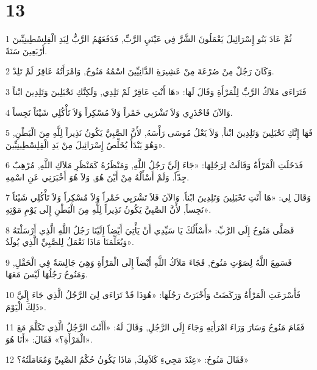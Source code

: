 \chapter{13}

\par 1 ثُمَّ عَادَ بَنُو إِسْرَائِيلَ يَعْمَلُونَ الشَّرَّ فِي عَيْنَيِ الرَّبِّ, فَدَفَعَهُمُ الرَّبُّ لِيَدِ الْفِلِسْطِينِيِّينَ أَرْبَعِينَ سَنَةً.
\par 2 وَكَانَ رَجُلٌ مِنْ صُرْعَةَ مِنْ عَشِيرَةِ الدَّانِيِّينَ اسْمُهُ مَنُوحُ, وَامْرَأَتُهُ عَاقِرٌ لَمْ تَلِدْ.
\par 3 فَتَرَاءَى مَلاَكُ الرَّبِّ لِلْمَرْأَةِ وَقَالَ لَهَا: «هَا أَنْتِ عَاقِرٌ لَمْ تَلِدِي, وَلَكِنَّكِ تَحْبَلِينَ وَتَلِدِينَ ابْناً
\par 4 وَالآنَ فَاحْذَرِي وَلاَ تَشْرَبِي خَمْراً وَلاَ مُسْكِراً وَلاَ تَأْكُلِي شَيْئاً نَجِساً.
\par 5 فَهَا إِنَّكِ تَحْبَلِينَ وَتَلِدِينَ ابْناً, وَلاَ يَعْلُ مُوسَى رَأْسَهُ, لأَنَّ الصَّبِيَّ يَكُونُ نَذِيراً لِلَّهِ مِنَ الْبَطْنِ, وَهُوَ يَبْدَأُ يُخَلِّصُ إِسْرَائِيلَ مِنْ يَدِ الْفِلِسْطِينِيِّينَ».
\par 6 فَدَخَلَتِ الْمَرْأَةُ وَقَالَتْ لِرَجُلِهَا: «جَاءَ إِلَيَّ رَجُلُ اللَّهِ, وَمَنْظَرُهُ كَمَنْظَرِ مَلاَكِ اللَّهِ, مُرْهِبٌ جِدّاً. وَلَمْ أَسْأَلْهُ مِنْ أَيْنَ هُوَ, وَلاَ هُوَ أَخْبَرَنِي عَنِ اسْمِهِ.
\par 7 وَقَالَ لِي: «هَا أَنْتِ تَحْبَلِينَ وَتَلِدِينَ ابْناً. وَالآنَ فَلاَ تَشْرَبِي خَمْراً وَلاَ مُسْكِراً وَلاَ تَأْكُلِي شَيْئاً نَجِساً, لأَنَّ الصَّبِيَّ يَكُونُ نَذِيراً لِلَّهِ مِنَ الْبَطْنِ إِلَى يَوْمِ مَوْتِهِ».
\par 8 فَصَلَّى مَنُوحُ إِلَى الرَّبِّ: «أَسْأَلُكَ يَا سَيِّدِي أَنْ يَأْتِيَ أَيْضاً إِلَيْنَا رَجُلُ اللَّهِ الَّذِي أَرْسَلْتَهُ وَيُعَلِّمَنَا مَاذَا نَعْمَلُ لِلصَّبِيِّ الَّذِي يُولَدُ».
\par 9 فَسَمِعَ اللَّهُ لِصَوْتِ مَنُوحَ, فَجَاءَ مَلاَكُ اللَّهِ أَيْضاً إِلَى الْمَرْأَةِ وَهِيَ جَالِسَةٌ فِي الْحَقْلِ, وَمَنُوحُ رَجُلُهَا لَيْسَ مَعَهَا.
\par 10 فَأَسْرَعَتِ الْمَرْأَةُ وَرَكَضَتْ وَأَخْبَرَتْ رَجُلَهَا: «هُوَذَا قَدْ تَرَاءَى لِيَ الرَّجُلُ الَّذِي جَاءَ إِلَيَّ ذَلِكَ الْيَوْمَ».
\par 11 فَقَامَ مَنُوحُ وَسَارَ وَرَاءَ امْرَأَتِهِ وَجَاءَ إِلَى الرَّجُلِ, وَقَالَ لَهُ: «أَأَنْتَ الرَّجُلُ الَّذِي تَكَلَّمَ مَعَ الْمَرْأَةِ؟» فَقَالَ: «أَنَا هُوَ».
\par 12 فَقَالَ مَنُوحُ: «عِنْدَ مَجِيءِ كَلاَمِكَ, مَاذَا يَكُونُ حُكْمُ الصَّبِيِّ وَمُعَامَلَتُهُ؟»
